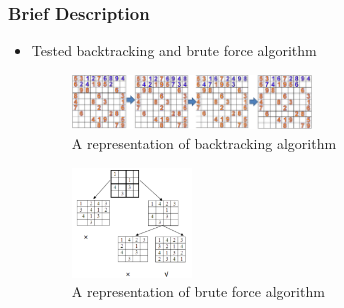 \documentclass{beamer}
\begin{document}
\begin{frame}
     \frametitle{Brief Description}   
     \begin{itemize}
		  \item Tested backtracking and brute force algorithm
               \vspace{4mm}
               \begin{figure}
                    \includegraphics[width=0.6\textwidth]{./brute2.png}                  
                    \caption{A representation of backtracking algorithm}
                    \centering
                    \end{figure}   
               \begin{figure}                    
                    \includegraphics[width=0.3\textwidth]{./brute.png}
                    \caption{A representation of brute force algorithm}
                    \centering
                    \end{figure}        
	 \end{itemize}
\end{frame}
\end{document}
